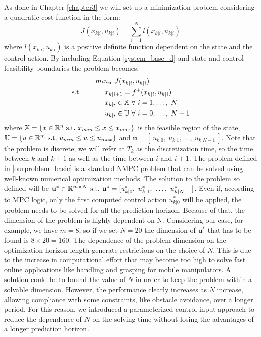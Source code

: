 As done in Chapter \ref{chapter3} we will set up a minimization problem considering a quadratic cost function in the form:
\begin{equation}\label{J_continua}
J({x}_{k|i},{u}_{k|i})=\sum_{i=1}^{N}l({x}_{k|i},{u}_{k|i})
\end{equation} 
where $l({x}_{k|i},{u}_{k|i})$ is a positive definite function dependent on the state and the control action. By including Equation \ref{system_base_d} and state and control feasibility boundaries the problem becomes: 
\begin{equation} \label{ourproblem_basic}
\begin{split}
		& min_{\textbf{u}}\ J({x}_{k|i},{u}_{k|i}) \\
		\textnormal{s.t.}\qquad
		&\ \ \ \ x_{k|i+1}=f^+(x_{k|i},u_{k|i}) \\
		&\ \ \ \ {x}_{k|i} \in \mathbb{X}\ \forall\ i=1,\dots,\ N  \\
		&\ \ \ \ {u}_{k|i} \in \mathbb{U}\ \forall\ i=0,\dots,\ N-1 \\
	\end{split}	
\end{equation}
where $\mathbb{X} = \lbrace {x}\in \mathbb{R}^n\ \textnormal{s.t.}\ {x}_{min}\leq x\leq x_{max} \rbrace$ is the feasible region of the state, $\mathbb{U} = \lbrace {u}\in \mathbb{R}^m\ \textnormal{s.t.}\ {u}_{min}\leq{u}\leq{u}_{max} \rbrace $ and $\textbf{u}=[\ u_{k|0},\ u_{k|1},\ \dots,\ u_{k|N-1}\ ]$.
Note that the problem is discrete; we will refer at $T_k$ as the discretization time, so the time between $k$ and $k+1$ as well as the time between $i$ and $i+1$.
The problem defined in \ref{ourproblem_basic} is a standard NMPC problem that can be solved using well-known numerical optimization methods. The solution to the problem so defined will be $\textbf{u}^* \in \mathbb{R}^{m\times N}\ \textnormal{s.t.}\ \textbf{u}^* =[{u}^*_{k|0},\ {u}^*_{k|1},\ \dots,\ {u}^*_{k|N-1}]$. Even if, according to MPC logic, only the first computed control action ${u}^*_{k|0}$ will be applied, the problem needs to be solved for all the prediction horizon. Because of that, the dimension of the problem is highly dependent on N. Considering our case, for example, we have $m=8$, so if we set $N=20$ the dimension of $\textbf{u}^*$ that has to be found is $8\times20=160$. The dependence of the problem dimension on the optimization horizon length generate restrictions on the choice of $N$. This is due to the increase in computational effort that may become too high to solve fast online applications like handling and grasping for mobile manipulators. A solution could be to bound the value of $N$ in order to keep the problem within a solvable dimension. However, the performance clearly increases as $N$ increase, allowing compliance with some constraints, like obstacle avoidance, over a longer period. For this reason, we introduced a parameterized control input approach to reduce the dependence of $N$ on the solving time without losing the advantages of a longer prediction horizon.

